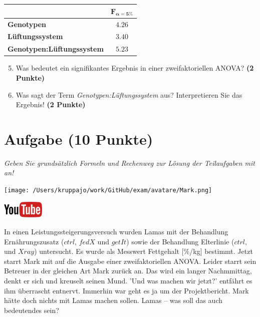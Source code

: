 \documentclass[a4paper, 9pt]{scrartcl}\usepackage[]{graphicx}\usepackage[]{xcolor}
\begin{document}
\begin{center}
    \Large
\begin{tabular}{lc}
  \toprule
     & $\boldsymbol{F_{\alpha = 5\%}}$ \\
\midrule
  \textbf{Genotypen} & $4.26$ \\
  \textbf{Lüftungssystem} & $3.40$ \\
  \textbf{Genotypen:Lüftungssystem} & $5.23$ \\
  \bottomrule
  \end{tabular}
\end{center}

\begin{enumerate}
  \setcounter{enumi}{4}
\item Was bedeutet ein signifikantes Ergebnis in einer zweifaktoriellen ANOVA? \textbf{(2 Punkte)}
\item Was sagt der Term \textit{Genotypen:Lüftungssystem} aus? Interpretieren Sie das Ergebnis! \textbf{(2 Punkte)}
\end{enumerate}
 
\clearpage

\section{Aufgabe \hfill (10 Punkte)}

\textit{Geben Sie grundsätzlich Formeln und Rechenweg zur Lösung der Teilaufgaben mit an!} \\[1Ex]
 

 
\begin{minipage}[t]{0.5\textwidth}
\texttt{[image: /Users/kruppajo/work/GitHub/exam/avatare/Mark.png]}
\end{minipage}
\begin{minipage}[t]{0.5\textwidth}
\hfill
\href{https://youtu.be/rWTyHXXlYjY}{\includegraphics[width = 2cm]{img/youtube}}\\[1Ex]
\end{minipage}
\vspace{1ex}



In einen Leistungssteigerungsversuch wurden Lamas mit der Behandlung Ernährungszusatz ($ctrl$, $fedX$ und $getIt$) sowie der Behandlung Elterlinie ($ctrl$, und $Xray$) untersucht. Es wurde als Messwert Fettgehalt [\%/kg] bestimmt. Jetzt starrt Mark mit auf die \Rlogo Ausgabe einer zweifaktoriellen ANOVA. Leider starrt sein Betreuer in der gleichen Art Mark zurück an. Das wird ein langer Nachmmittag, denkt er sich und kreuselt seinen Mund. 'Und was machen wir jetzt?' entfährt es ihm überrascht entnervt. Immerhin war geht es ja um der Projektbericht. Mark hätte doch nichts mit Lamas machen sollen. Lamas -- was soll das auch bedeutendes sein?
\end{document}
